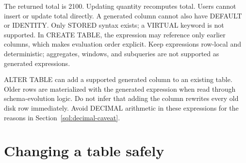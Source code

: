 The returned total is 2100. Updating quantity recomputes total. Users cannot insert or update total directly. A generated column cannot also have DEFAULT or IDENTITY. Only STORED syntax exists; a VIRTUAL keyword is not supported. In CREATE TABLE, the expression may reference only earlier columns, which makes evaluation order explicit. Keep expressions row-local and deterministic; aggregates, windows, and subqueries are not supported as generated expressions.

ALTER TABLE can add a supported generated column to an existing table. Older rows are materialized with the generated expression when read through schema-evolution logic. Do not infer that adding the column rewrites every old disk row immediately. Avoid DECIMAL arithmetic in these expressions for the reasons in Section~\ref{sql:decimal-caveat}.


\section{Changing a table safely}

